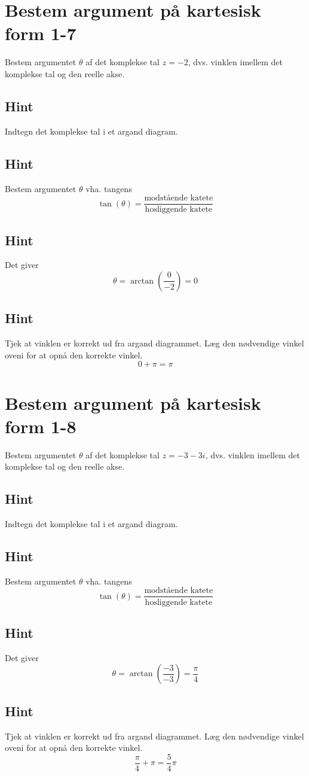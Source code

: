 \documentclass{article}
\newenvironment{exercise}[1]{\newpage\section{#1}}{}
\newcommand{\answerbox}[1]{\fbox{$#1$}}
\newcommand{\hint}{\subsection*{Hint}}
\begin{document}
\begin{exercise}{Bestem argument på kartesisk form 1-7}
	
	Bestem argumentet $\theta$ af det komplekse tal $z=-2$, dvs. vinklen imellem det komplekse tal og den reelle akse.
	
	\answerbox{\pi}
	
	
	\hint 
	
	Indtegn det komplekse tal i et argand diagram.
	
	
	\hint
	
	Bestem argumentet $\theta$ vha. tangens
	\[
	\tan(\theta)=\frac{\textrm{modstående katete}}{\textrm{hosliggende katete}}
	\]
	
	\hint 
	
	Det giver
	\[
	\theta = \arctan \left(\frac{0}{-2}\right) = 0
	\]
	
	\hint
	
	Tjek at vinklen er korrekt ud fra argand diagrammet. Læg den nødvendige vinkel oveni for at opnå den korrekte vinkel. 
	\[
	0+ \pi = \pi
	\]
	
	
\end{exercise}

\newpage

\begin{exercise}{Bestem argument på kartesisk form 1-8}
	
	Bestem argumentet $\theta$ af det komplekse tal $z=-3-3i$, dvs. vinklen imellem det komplekse tal og den reelle akse.
	
	\answerbox{\frac{5}{4} \pi}
	
	
	\hint 
	
	Indtegn det komplekse tal i et argand diagram.
	
	
	\hint
	
	Bestem argumentet $\theta$ vha. tangens
	\[
	\tan(\theta)=\frac{\textrm{modstående katete}}{\textrm{hosliggende katete}}
	\]
	
	\hint 
	
	Det giver
	\[
	\theta = \arctan \left(\frac{-3}{-3}\right) = \frac{\pi}{4}
	\]
	
	\hint
	
	Tjek at vinklen er korrekt ud fra argand diagrammet. Læg den nødvendige vinkel oveni for at opnå den korrekte vinkel. 
	\[
	\frac{\pi}{4} + \pi = \frac{5}{4} \pi
	\]
	
	
\end{exercise}
\end{document}

